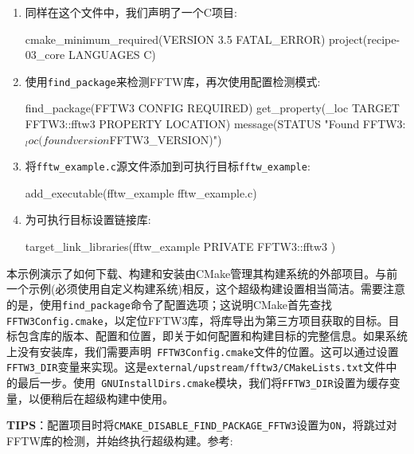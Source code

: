 \begin{enumerate}
\item 同样在这个文件中，我们声明了一个C项目:

\begin{codebox}[cmake]
cmake_minimum_required(VERSION 3.5 FATAL_ERROR)
project(recipe-03_core LANGUAGES C)
\end{codebox}

\item 使用\texttt{find\_package}来检测FFTW库，再次使用配置检测模式:

\begin{codebox}[cmake]
find_package(FFTW3 CONFIG REQUIRED)
get_property(_loc TARGET FFTW3::fftw3 PROPERTY LOCATION)
message(STATUS "Found FFTW3: ${_loc} (found version ${FFTW3_VERSION})")
\end{codebox}

\item 将\texttt{fftw\_example.c}源文件添加到可执行目标\texttt{fftw\_example}:

\begin{codebox}[cmake]
add_executable(fftw_example fftw_example.c)
\end{codebox}

\item 为可执行目标设置链接库:

\begin{codebox}[cmake]
target_link_libraries(fftw_example
  PRIVATE
    FFTW3::fftw3
  ) 
\end{codebox}

\end{enumerate}


本示例演示了如何下载、构建和安装由CMake管理其构建系统的外部项目。与前一个示例(必须使用自定义构建系统)相反，这个超级构建设置相当简洁。需要注意的是，使用\texttt{find\_package}命令了配置选项；这说明CMake首先查找\texttt{FFTW3Config.cmake}，以定位FFTW3库，将库导出为第三方项目获取的目标。目标包含库的版本、配置和位置，即关于如何配置和构建目标的完整信息。如果系统上没有安装库，我们需要声明\texttt{ FFTW3Config.cmake}文件的位置。这可以通过设置\texttt{FFTW3\_DIR}变量来实现。这是\texttt{external/upstream/fftw3/CMakeLists.txt}文件中的最后一步。使用\texttt{ GNUInstallDirs.cmake}模块，我们将\texttt{FFTW3\_DIR}设置为缓存变量，以便稍后在超级构建中使用。

\begin{myInfoBox}
\textbf{TIPS}：配置项目时将\texttt{CMAKE\_DISABLE\_FIND\_PACKAGE\_FFTW3}设置为\texttt{ON}，将跳过对FFTW库的检测，并始终执行超级构建。参考:
\end{myInfoBox}


